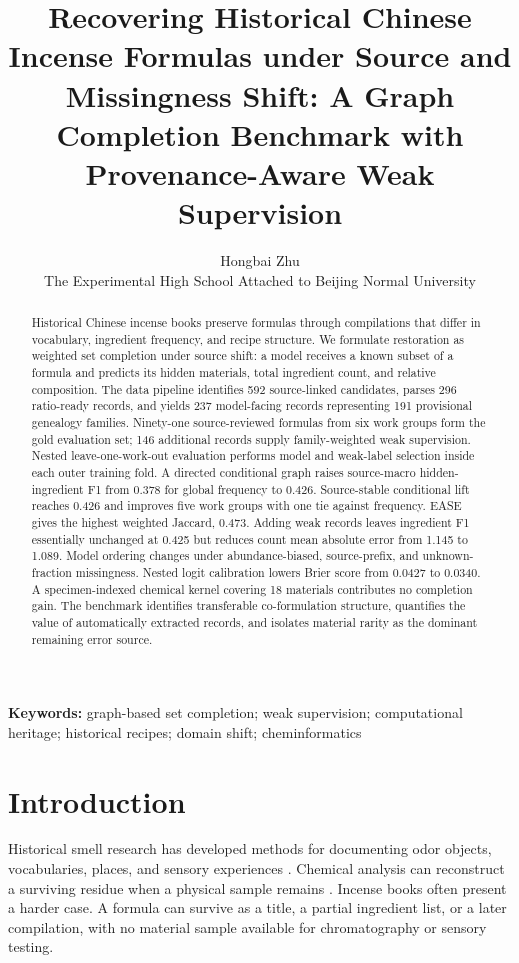 \documentclass[11pt,a4paper]{article}
\title{Recovering Historical Chinese Incense Formulas under Source and Missingness Shift: A Graph Completion Benchmark with Provenance-Aware Weak Supervision}
\author{Hongbai Zhu\\[0.35em]\normalsize The Experimental High School Attached to Beijing Normal University}
\date{}
\begin{document}
\maketitle

\begin{abstract}
Historical Chinese incense books preserve formulas through compilations that differ in vocabulary, ingredient frequency, and recipe structure. We formulate restoration as weighted set completion under source shift: a model receives a known subset of a formula and predicts its hidden materials, total ingredient count, and relative composition. The data pipeline identifies 592 source-linked candidates, parses 296 ratio-ready records, and yields 237 model-facing records representing 191 provisional genealogy families. Ninety-one source-reviewed formulas from six work groups form the gold evaluation set; 146 additional records supply family-weighted weak supervision. Nested leave-one-work-out evaluation performs model and weak-label selection inside each outer training fold. A directed conditional graph raises source-macro hidden-ingredient F1 from 0.378 for global frequency to 0.426. Source-stable conditional lift reaches 0.426 and improves five work groups with one tie against frequency. EASE gives the highest weighted Jaccard, 0.473. Adding weak records leaves ingredient F1 essentially unchanged at 0.425 but reduces count mean absolute error from 1.145 to 1.089. Model ordering changes under abundance-biased, source-prefix, and unknown-fraction missingness. Nested logit calibration lowers Brier score from 0.0427 to 0.0340. A specimen-indexed chemical kernel covering 18 materials contributes no completion gain. The benchmark identifies transferable co-formulation structure, quantifies the value of automatically extracted records, and isolates material rarity as the dominant remaining error source.
\end{abstract}

\noindent\textbf{Keywords:} graph-based set completion; weak supervision; computational heritage; historical recipes; domain shift; cheminformatics

\section{Introduction}

Historical smell research has developed methods for documenting odor objects, vocabularies, places, and sensory experiences \citep{bembibre2017_smell_heritage,lisena2022_odeuropa}. Chemical analysis can reconstruct a surviving residue when a physical sample remains \citep{paolin2026_historical_smells}. Incense books often present a harder case. A formula can survive as a title, a partial ingredient list, or a later compilation, with no material sample available for chromatography or sensory testing.
\end{document}
